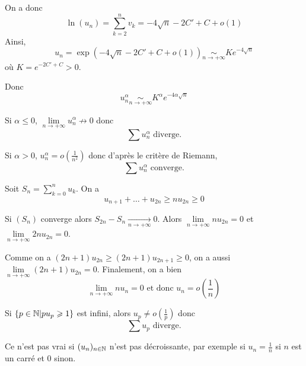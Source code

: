\begin{solution}
	On a donc 
	$$\ln(u_{n})=\sum_{k=2}^{n}v_{k}=-4\sqrt{n}-2C'+C+o\left(1\right)$$
	Ainsi, 
	$$u_{n}=\exp\left(-4\sqrt{n}-2C'+C+o\left(1\right)\right)\underset{n\to+\infty}{\sim}Ke^{-4\sqrt{n}}$$
	où $K=e^{-2C'+C}>0$.

	Donc 
	$$u_{n}^{\alpha}\underset{n\to+\infty}{\sim}K^{\alpha}e^{-4\alpha\sqrt{n}}$$

	Si $\alpha\leqslant0$, $\lim\limits_{n\to+\infty}u_{n}^{\alpha}\not\to 0$
	donc 
	$$\boxed{\sum u_{n}^{\alpha}\text{ diverge.}}$$

	Si $\alpha>0$, $u_{n}^{\alpha}=o\left(\frac{1}{n^{2}}\right)$ donc d'après le critère de Riemann, 
	$$\boxed{\sum u_{n}^{\alpha}\text{ converge.}}$$
\end{solution}

\begin{solution}
	Soit $S_{n}=\sum_{k=0}^{n}u_{k}$. On a 
	$$u_{n+1}+\dots+u_{2n}\geqslant nu_{2n}\geqslant0$$

	Si $(S_{n})$ converge alors $S_{2n}-S_{n}\xrightarrow[n\to+\infty]{}0$. Alors $\lim\limits_{n\to+\infty}nu_{2n}=0$ et $\lim\limits_{n\to+\infty}2n u_{2n}=0$.

	Comme on a $(2n+1)u_{2n}\geqslant (2n+1)u_{2n+1}\geqslant0$, on a aussi $\lim\limits_{n\to+\infty}(2n+1) u_{2n}=0$. Finalement, on a bien 
	$$\boxed{\lim\limits_{n\to+\infty}nu_{n}=0\text{ et donc }u_{n}=o\left(\frac{1}{n}\right)}$$

	Si $\left\{p\in\mathbb{N} \middle|pu_{p}\geqslant1 \right\}$ est infini, alors $u_{p}\neq o\left(\frac{1}{p}\right)$ donc 
	$$\boxed{\sum u_{p}\text{ diverge.}}$$
\end{solution}

\begin{remark}
	Ce n'est pas vrai si $(u_{n})_{n\in\mathbb{N}}$ n'est pas décroissante, par exemple si $u_{n}=\frac{1}{n}$ si $n$ est un carré et 0 sinon.
\end{remark}

